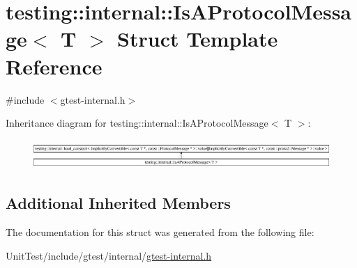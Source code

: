 \hypertarget{structtesting_1_1internal_1_1_is_a_protocol_message}{\section{testing\+:\+:internal\+:\+:Is\+A\+Protocol\+Message$<$ T $>$ Struct Template Reference}
\label{structtesting_1_1internal_1_1_is_a_protocol_message}
}


{\ttfamily \#include $<$gtest-\/internal.\+h$>$}

Inheritance diagram for testing\+:\+:internal\+:\+:Is\+A\+Protocol\+Message$<$ T $>$\+:\begin{figure}[H]
\begin{center}
\leavevmode
\includegraphics[height=1.132457cm]{structtesting_1_1internal_1_1_is_a_protocol_message}
\end{center}
\end{figure}
\subsection*{Additional Inherited Members}


The documentation for this struct was generated from the following file\+:\begin{DoxyCompactItemize}
\item 
Unit\+Test/include/gtest/internal/\hyperlink{gtest-internal_8h}{gtest-\/internal.\+h}\end{DoxyCompactItemize}
